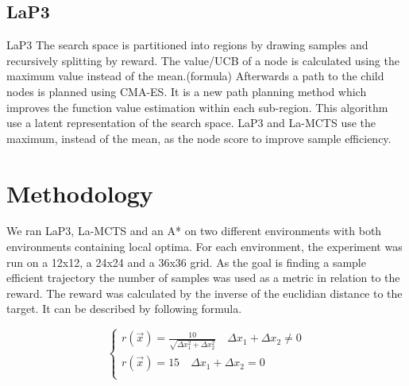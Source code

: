 \documentclass[bibliography=totoc]{scrartcl}
\begin{document}
\subsection{LaP3}
\ac{LaP3} The search space is partitioned into regions by drawing samples and recursively splitting by reward. The value/UCB of a node is calculated using the maximum value instead of the mean.(formula) Afterwards a path to the child nodes is planned using CMA-ES\cite{CMA-ES}.
\cite{NEURIPS2021_03a3655f}
It is a new path planning method which improves the function value estimation within each sub-region.
This algorithm use a latent representation of the search space.
\ac{LaP3} and \ac{La-MCTS} use the maximum, instead of the mean, as the node score to improve sample efficiency.


\newpage
\section{Methodology}
We ran \ac{LaP3}, \ac{La-MCTS} and an A* on two different environments with both environments containing local optima. For each environment, the experiment was run on a 12x12, a 24x24 and a 36x36 grid. As the goal is finding a sample efficient trajectory the number of samples was used as a metric in relation to the reward. The reward was calculated by the inverse of the euclidian distance to the target. It can be described by following formula. 

\begin{equation}
\left\{
\begin{array}{lll}
 r(\vec{x})=\frac{10}{\sqrt{\Delta x_1 ^2+\Delta x_2 ^2}}\quad \Delta x_1 + \Delta x_2 \neq 0\\
r(\vec{x})=15\quad \Delta x_1 + \Delta x_2 =0\\
\end{array}
\right.
\end{equation}
\end{document}
